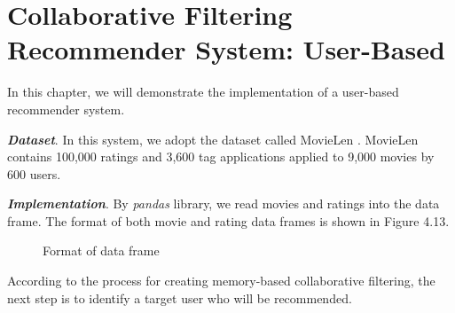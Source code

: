 \section{Collaborative Filtering Recommender System: User-Based }
In this chapter, we will demonstrate the implementation of a user-based recommender system.

\textbf{\textit{Dataset}}. In this system, we adopt the dataset called MovieLen \cite{movielens}. MovieLen contains 100,000 ratings and 3,600 tag applications applied to 9,000 movies by 600 users.

\textbf{\textit{Implementation}}. By \textit{pandas} library, we read movies and ratings into the data frame. The format of both movie and rating data frames is shown in Figure 4.13.
    \begin{figure}[htbp]
\centering
{}%
%
\centering
\caption{Format of data frame}
\end{figure} 

According to the process for creating memory-based collaborative filtering, the next step is to identify a target user who will be recommended.

